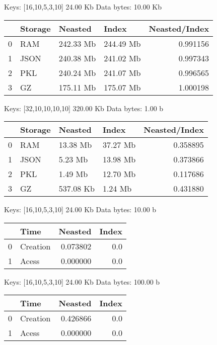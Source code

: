 {Keys: [16,10,5,3,10] 24.00 Kb  Data bytes: 10.00 Kb 

\begin{tabular}{llllr}
	\toprule
	{} & Storage &    Neasted &      Index &  Neasted/Index \\
	\midrule
	0 &     RAM &  242.33 Mb &  244.49 Mb &       0.991156 \\
	1 &   JSON  &  240.38 Mb &  241.02 Mb &       0.997343 \\
	2 &     PKL &  240.24 Mb &  241.07 Mb &       0.996565 \\
	3 &      GZ &  175.11 Mb &  175.07 Mb &       1.000198 \\
	\bottomrule
\end{tabular}


Keys: [32,10,10,10,10] 320.00 Kb  Data bytes: 1.00 b 

\begin{tabular}{llllr}
	\toprule
	{} & Storage &    Neasted &     Index &  Neasted/Index \\
	\midrule
	0 &     RAM &   13.38 Mb &  37.27 Mb &       0.358895 \\
	1 &   JSON  &    5.23 Mb &  13.98 Mb &       0.373866 \\
	2 &     PKL &    1.49 Mb &  12.70 Mb &       0.117686 \\
	3 &      GZ &  537.08 Kb &   1.24 Mb &       0.431880 \\
	\bottomrule
\end{tabular}

Keys: [16,10,5,3,10] 24.00 Kb  Data bytes: 10.00 b 

\begin{tabular}{llrr}
	\toprule
	{} &      Time &   Neasted &  Index \\
	\midrule
	0 &  Creation &  0.073802 &    0.0 \\
	1 &     Acess &  0.000000 &    0.0 \\
	\bottomrule
\end{tabular}


Keys: [16,10,5,3,10] 24.00 Kb  Data bytes: 100.00 b 

\begin{tabular}{llrr}
	\toprule
	{} &      Time &   Neasted &  Index \\
	\midrule
	0 &  Creation &  0.426866 &    0.0 \\
	1 &     Acess &  0.000000 &    0.0 \\
	\bottomrule
\end{tabular}


}
